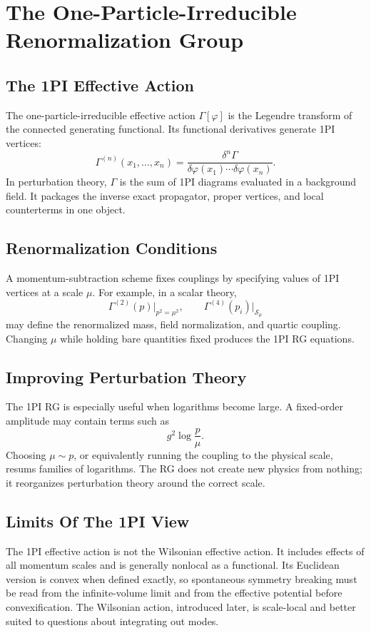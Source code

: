 \chapter{The One-Particle-Irreducible Renormalization Group}
\label{ch:volume-ii-11}

\section{The 1PI Effective Action}

The one-particle-irreducible effective action \(\Gamma[\varphi]\) is the
Legendre transform of the connected generating functional. Its functional
derivatives generate 1PI vertices:
\[
  \Gamma^{(n)}(x_1,\ldots,x_n)
  =
  \frac{\delta^n\Gamma}{\delta\varphi(x_1)\cdots\delta\varphi(x_n)}.
\]
In perturbation theory, \(\Gamma\) is the sum of 1PI diagrams evaluated in a
background field. It packages the inverse exact propagator, proper vertices,
and local counterterms in one object.

\section{Renormalization Conditions}

A momentum-subtraction scheme fixes couplings by specifying values of 1PI
vertices at a scale \(\mu\). For example, in a scalar theory,
\[
  \Gamma^{(2)}(p)\big|_{p^2=\mu^2},\qquad
  \Gamma^{(4)}(p_i)\big|_{\mathcal S_\mu}
\]
may define the renormalized mass, field normalization, and quartic coupling.
Changing \(\mu\) while holding bare quantities fixed produces the 1PI RG
equations.

\section{Improving Perturbation Theory}

The 1PI RG is especially useful when logarithms become large. A fixed-order
amplitude may contain terms such as
\[
  g^2\log\frac{p}{\mu}.
\]
Choosing \(\mu\sim p\), or equivalently running the coupling to the physical
scale, resums families of logarithms. The RG does not create new physics from
nothing; it reorganizes perturbation theory around the correct scale.

\section{Limits Of The 1PI View}

The 1PI effective action is not the Wilsonian effective action. It includes
effects of all momentum scales and is generally nonlocal as a functional. Its
Euclidean version is convex when defined exactly, so spontaneous symmetry
breaking must be read from the infinite-volume limit and from the effective
potential before convexification. The Wilsonian action,
introduced later, is scale-local and better suited to questions about
integrating out modes.
